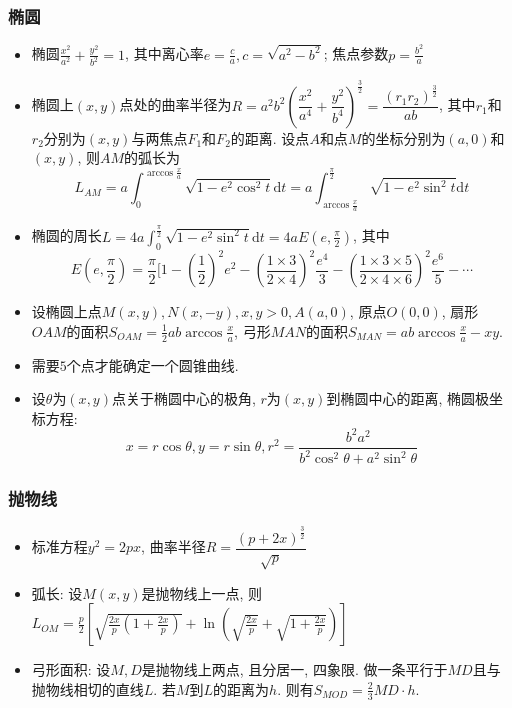 \documentclass[landscape, twocolumn, 8pt, a4paper, twoside]{extarticle}
\begin{document}
    \subsubsection{椭圆}
    \begin{itemize}
    \item 椭圆$\frac{x^2}{a^2} + \frac{y^2}{b^2} = 1$, 其中离心率$e = \frac{c}{a}, c = \sqrt{a^2 - b^2}$; 焦点参数$p = \frac{b^2}{a}$
    \item 椭圆上$(x, y)$点处的曲率半径为$R = a^2 b^2 (\dfrac{x^2}{a^4} + \dfrac{y^2}{b^4})^\frac{3}{2} = \dfrac{(r_1 r_2)^\frac{3}{2}}{ab}$, 其中$r_1$和$r_2$分别为$(x, y)$与两焦点$F_1$和$F_2$的距离. 设点$A$和点$M$的坐标分别为$(a, 0)$和$(x, y)$, 则$AM$的弧长为
    \[ L_{AM} = a \int_0^{\arccos{\frac{x}{a} }} \sqrt{1 - e^2 \cos^2 t} \textrm{d} t = a \int_{\arccos{\frac{x}{a} }}^\frac{\pi}{2} \sqrt{1 - e^2 \sin^2 t} \textrm{d} t\]
    \item 椭圆的周长$L = 4a \int_0^{\frac{\pi}{2}} \sqrt{1 - e^2 \sin^2 t } \textrm{d} t = 4a E(e, \frac{\pi}{2})$, 其中
    \[ E(e, \frac{\pi}{2}) = \frac{\pi}{2} [ 1 - (\frac{1}{2})^2 e^2 - (\frac{1 \times 3}{2 \times 4})^2 \frac{e^4}{3} - (\frac{1 \times 3 \times 5}{2 \times 4 \times 6})^2 \frac{e^6}{5} - \cdots\]
    \item 设椭圆上点$M(x, y), N(x, -y), x, y > 0, A(a, 0)$, 原点$O(0, 0)$, 扇形$OAM$的面积$S_{OAM} = \frac{1}{2} ab \arccos{\frac{x}{a}}$, 弓形$MAN$的面积$S_{MAN} = ab \arccos{\frac{x}{a}} - xy$.
    \item 需要$5$个点才能确定一个圆锥曲线.
    \item 设$\theta$为$(x, y)$点关于椭圆中心的极角, $r$为$(x, y)$到椭圆中心的距离, 椭圆极坐标方程:
    \[ x = r \cos \theta, y = r \sin \theta, r^2 = \frac{b^2 a^2}{b^2 \cos^2 \theta + a^2 \sin^2 \theta}\]
  \end{itemize}
  
    \subsubsection{抛物线}
    \begin{itemize}
    \item 标准方程$y^2 = 2px$, 曲率半径$ R = \dfrac{(p + 2x)^{\frac{3}{2} }}{\sqrt{p}}$
    \item 弧长: 设$M(x, y)$是抛物线上一点, 则$L_{OM} = \frac{p}{2} [ \sqrt{\frac{2x}{p}(1 + \frac{2x}{p})} + \ln(\sqrt{\frac{2x}{p}} + \sqrt{1 + \frac{2x}{p}})]$
    \item 弓形面积: 设$M, D$是抛物线上两点, 且分居一, 四象限. 做一条平行于$MD$且与抛物线相切的直线$L$. 若$M$到$L$的距离为$h$. 则有$S_{MOD} = \frac{2}{3}MD \cdot h$.
    \end{itemize}
\end{document}
